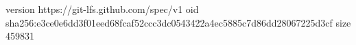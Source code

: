 version https://git-lfs.github.com/spec/v1
oid sha256:e3ce0e6dd3f01eed68fcaf52ccc3dc0543422a4ec5885c7d86dd28067225d3cf
size 459831
